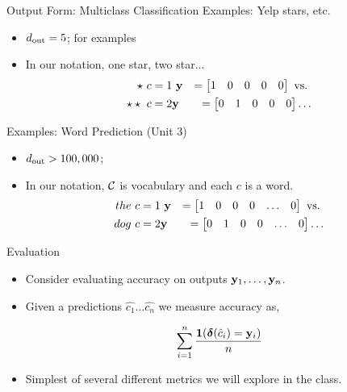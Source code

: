 \documentclass{beamer}
\begin{document}
\begin{frame}{Output Form: Multiclass Classification}
  Examples: Yelp stars, etc.
  \begin{itemize}
  \item ${d_{\mathrm{out}}} = 5$; for examples
  \item In our notation, one star, two star...
    \begin{eqnarray*} 
      \star \ c = 1 & \  \mathbf{y} &= \begin{bmatrix} 1 & 0 & 0 & 0 & 0  \end{bmatrix}  \mathrm {\ vs. \ } \\
    \star \star \ c = 2 & \mathbf{y} &=    \begin{bmatrix} 0 & 1 & 0 & 0 & 0 \end{bmatrix} \ldots
   \end{eqnarray*} 
  \end{itemize}
  Examples: Word Prediction (Unit 3)
  \begin{itemize}
  \item ${d_{\mathrm{out}}} > 100,000$; 
  \item In our notation, $\mathcal{C}$ is vocabulary and each $c$ is a word.   
    \begin{eqnarray*} 
      the \ c = 1 & \  \mathbf{y} &= \begin{bmatrix} 1 & 0 & 0 & 0 & \ldots & 0  \end{bmatrix}  \mathrm {\ vs. \ } \\
      dog \ c = 2 & \mathbf{y} &=    \begin{bmatrix} 0 & 1 & 0 & 0 & \ldots & 0 \end{bmatrix} \ldots
   \end{eqnarray*} 
  \end{itemize}
\end{frame}

\begin{frame}{Evaluation}
  \begin{itemize}
  \item Consider evaluating accuracy on outputs $\mathbf{y}_1, \ldots, \mathbf{y}_n$. 

  \item Given a predictions $\hat{c_1} \ldots \hat{c_n}$ we measure 
  accuracy as,
  
  \[ \sum_{i=1}^n \frac{\mathbf{1}(\boldsymbol{\delta}(\hat{c}_i) = \mathbf{y}_i)}{ n} \] 

  \item Simplest of  several different metrics we will explore in the class. 
  \end{itemize}
\end{frame}
\end{document}
